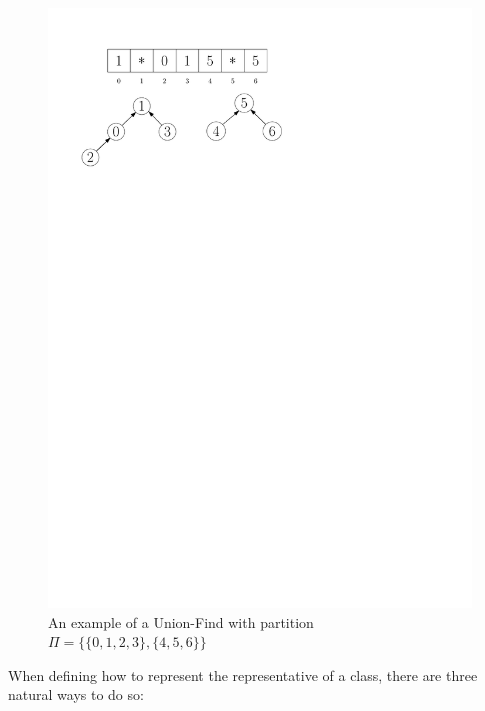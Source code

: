 \begin{figure}
    \centering
    \includegraphics[scale=0.75]{images/ufExample.pdf}
    \caption{An example of a Union-Find with partition $\Pi = \{ \{0,1,2,3\}, \{4,5,6\}\}$}
    \label{fig:example}
\end{figure}

When defining how to represent the representative of a class, there are three natural ways to do so:

